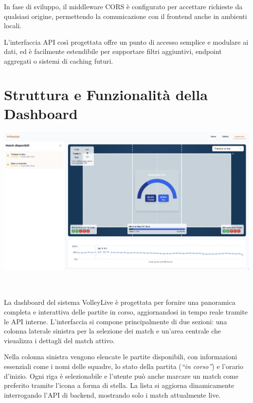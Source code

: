 \documentclass[a4paper,12pt]{report}
\begin{document}
In fase di sviluppo, il middleware CORS è configurato per accettare richieste da qualsiasi origine, permettendo la comunicazione con il frontend anche in ambienti locali.

L’interfaccia API così progettata offre un punto di accesso semplice e modulare ai dati, ed è facilmente estendibile per supportare filtri aggiuntivi, endpoint aggregati o sistemi di caching futuri.


\section{Struttura e Funzionalità della Dashboard}

\noindent\begin{minipage}{\textwidth}
  \centering
  \includegraphics[width=\textwidth]{dashboard.png}
  \label{fig:dashboard}
\end{minipage}

\\
\\
La dashboard del sistema VolleyLive è progettata per fornire una panoramica completa e interattiva delle partite in corso, aggiornandosi in tempo reale tramite le API interne. L’interfaccia si compone principalmente di due sezioni: una colonna laterale sinistra per la selezione dei match e un’area centrale che visualizza i dettagli del match attivo.

Nella colonna sinistra vengono elencate le partite disponibili, con informazioni essenziali come i nomi delle squadre, lo stato della partita (\textit{``in corso''}) e l’orario d’inizio. Ogni riga è selezionabile e l’utente può anche marcare un match come preferito tramite l’icona a forma di stella. La lista si aggiorna dinamicamente interrogando l’API di backend, mostrando solo i match attualmente live.
\end{document}
